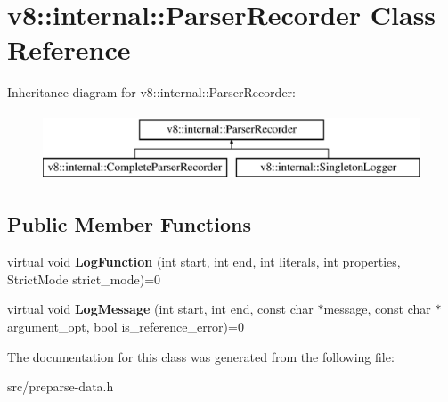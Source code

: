 \hypertarget{classv8_1_1internal_1_1_parser_recorder}{}\section{v8\+:\+:internal\+:\+:Parser\+Recorder Class Reference}
\label{classv8_1_1internal_1_1_parser_recorder}
Inheritance diagram for v8\+:\+:internal\+:\+:Parser\+Recorder\+:\begin{figure}[H]
\begin{center}
\leavevmode
\includegraphics[height=2.000000cm]{classv8_1_1internal_1_1_parser_recorder}
\end{center}
\end{figure}
\subsection*{Public Member Functions}
\begin{DoxyCompactItemize}
\item 
\hypertarget{classv8_1_1internal_1_1_parser_recorder_a0eb253c90a8d9f5facdf141bd28574b1}{}virtual void {\bfseries Log\+Function} (int start, int end, int literals, int properties, Strict\+Mode strict\+\_\+mode)=0\label{classv8_1_1internal_1_1_parser_recorder_a0eb253c90a8d9f5facdf141bd28574b1}

\item 
\hypertarget{classv8_1_1internal_1_1_parser_recorder_a3caafa564b32131f91804f537edb7c90}{}virtual void {\bfseries Log\+Message} (int start, int end, const char $\ast$message, const char $\ast$argument\+\_\+opt, bool is\+\_\+reference\+\_\+error)=0\label{classv8_1_1internal_1_1_parser_recorder_a3caafa564b32131f91804f537edb7c90}

\end{DoxyCompactItemize}


The documentation for this class was generated from the following file\+:\begin{DoxyCompactItemize}
\item 
src/preparse-\/data.\+h\end{DoxyCompactItemize}
